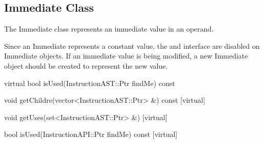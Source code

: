\subsection{Immediate Class}
\label{sec:immediate}

The Immediate class represents an immediate value in an operand.

Since an Immediate represents a constant value, the  and
 interface are disabled on Immediate objects. If an immediate
value is being modified, a new Immediate object should be created to represent
the new value. 

\begin{apient}
virtual bool isUsed(InstructionAST::Ptr findMe) const
\end{apient}

\begin{apient}
    void getChildre(vector<InstructionAST::Ptr> &) const [virtual]
\end{apient}

\begin{apient}
    void getUses(set<InstructionAST::Ptr> &) [virtual]
\end{apient}

\begin{apient}
    bool isUsed(InstructionAPI::Ptr findMe) const [virtual]
\end{apient}

